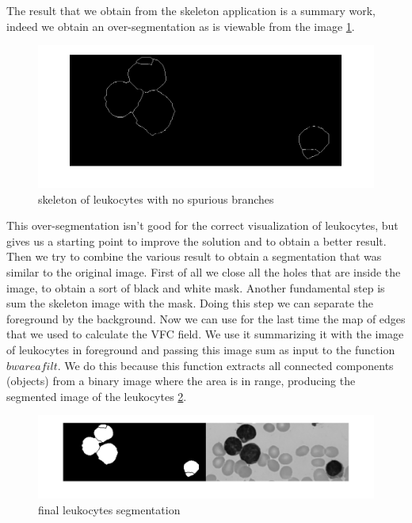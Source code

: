 The result that we obtain from the skeleton application is a summary work, indeed we obtain an over-segmentation as is viewable from the image \ref{fig:skelfin}.
\begin{figure}
	\begin{center}
		\centering
		\includegraphics[scale=0.5]{img/skelfin.png}
		\caption{skeleton of leukocytes with no spurious branches}
		\label{fig:skelfin}
	\end{center}
\end{figure}
This over-segmentation isn't good for the correct visualization of leukocytes, but gives us a starting point to improve the solution and to obtain a better result.
Then we try to combine the various result to obtain a segmentation that was similar to the original image. First of all we close all the holes that are inside the image, to obtain a sort of black and white mask. Another fundamental step is sum the skeleton image with the mask. Doing this step we can separate the foreground by the background. Now we can use for the last time the map of edges that we used to calculate the VFC field. We use it summarizing it with the image of leukocytes in foreground and passing this image sum as input to the function $bwareafilt$. We do this because this function extracts all connected components (objects)
from a binary image where the area is in range, producing the segmented image of the leukocytes \ref{fig:bwarea}.
\begin{figure}
	\begin{center}
		\centering
		\includegraphics[scale=0.3]{img/segmentation.png}
		\caption{final leukocytes segmentation }
		\label{fig:bwarea}
	\end{center}
\end{figure}
